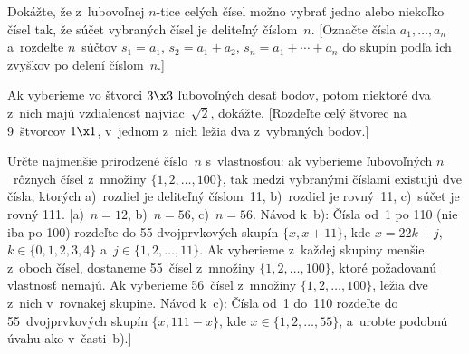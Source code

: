 {Dokážte, že z~ľubovoľnej $n$-tice celých čísel možno vybrať jedno
alebo niekoľko čísel tak, že súčet vybraných čísel je deliteľný
číslom~$n$. [Označte čísla $a_1,\dots,a_n$ a~rozdeľte $n$~súčtov
$s_1=a_1$, $s_2=a_1+a_2$, $s_n=a_1+\cdots+a_n$ do skupín podľa
ich zvyškov po delení číslom~$n$.]

Ak vyberieme vo štvorci $3\x3$ ľubovoľných desať bodov, potom niektoré
dva z~nich majú vzdialenosť najviac~$\sqrt2$, dokážte. [Rozdeľte
celý štvorec na 9~štvorcov $1\x1$, v~jednom z~nich ležia dva
z~vybraných bodov.]

Určte najmenšie prirodzené číslo~$n$ s~vlastnosťou: ak vyberieme
ľubovoľných $n$~rôznych čísel z~množiny $\{1,2,\dots,100\}$, tak
medzi vybranými číslami existujú dve čísla, ktorých a)~rozdiel je
deliteľný číslom~11, b)~rozdiel je rovný~11, c)~súčet je rovný
111. [a)~$n=12$, b)~$n=56$, c)~$n=56$. Návod k~b): Čísla od~1 po
110 (nie iba po 100) rozdeľte do 55 dvojprvkových skupín
$\{x,x+11\}$, kde $x=22k+j$, $k\in\{0,1,2,3,4\}$
a~$j\in\{1,2,\dots,11\}$. Ak vyberieme z~každej skupiny menšie
z~oboch čísel, dostaneme 55~čísel z~množiny $\{1,2,\dots,100\}$,
ktoré požadovanú vlastnosť nemajú. Ak vyberieme 56~čísel
z~množiny $\{1,2,\dots,100\}$, ležia dve z~nich v~rovnakej skupine.
Návod k~c): Čísla od~1 do~110 rozdeľte do 55~dvojprvkových skupín
$\{x,111-x\}$, kde $x\in\{1,2,\dots,55\}$, a~urobte podobnú
úvahu ako v~časti~b).]
}

